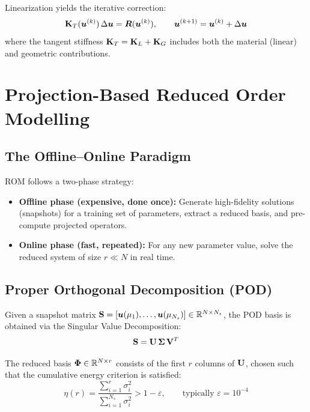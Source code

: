 Linearization yields the iterative correction:
\begin{equation}
    \mathbf{K}_T(\bm{u}^{(k)}) \, \Delta\bm{u} = \bm{R}(\bm{u}^{(k)}), \qquad \bm{u}^{(k+1)} = \bm{u}^{(k)} + \Delta\bm{u}
\end{equation}
where the tangent stiffness $\mathbf{K}_T = \mathbf{K}_L + \mathbf{K}_G$ includes both the material (linear) and geometric contributions.

\section{Projection-Based Reduced Order Modelling}
\label{sec:rom}

\subsection{The Offline--Online Paradigm}

ROM follows a two-phase strategy:
\begin{itemize}
    \item \textbf{Offline phase (expensive, done once):} Generate high-fidelity solutions (snapshots) for a training set of parameters, extract a reduced basis, and pre-compute projected operators.
    \item \textbf{Online phase (fast, repeated):} For any new parameter value, solve the reduced system of size $r \ll N$ in real time.
\end{itemize}

\subsection{Proper Orthogonal Decomposition (POD)}

Given a snapshot matrix $\mathbf{S} = [\bm{u}(\mu_1), \ldots, \bm{u}(\mu_{N_s})] \in \mathbb{R}^{N \times N_s}$, the POD basis is obtained via the Singular Value Decomposition:
\begin{equation}
    \mathbf{S} = \mathbf{U} \, \mathbf{\Sigma} \, \mathbf{V}^T
\end{equation}

The reduced basis $\mathbf{\Phi} \in \mathbb{R}^{N \times r}$ consists of the first $r$ columns of $\mathbf{U}$, chosen such that the cumulative energy criterion is satisfied:
\begin{equation}
    \eta(r) = \frac{\sum_{i=1}^{r} \sigma_i^2}{\sum_{i=1}^{N_s} \sigma_i^2} > 1 - \varepsilon, \qquad \text{typically } \varepsilon = 10^{-4}
    \label{eq:energy-criterion}
\end{equation}


